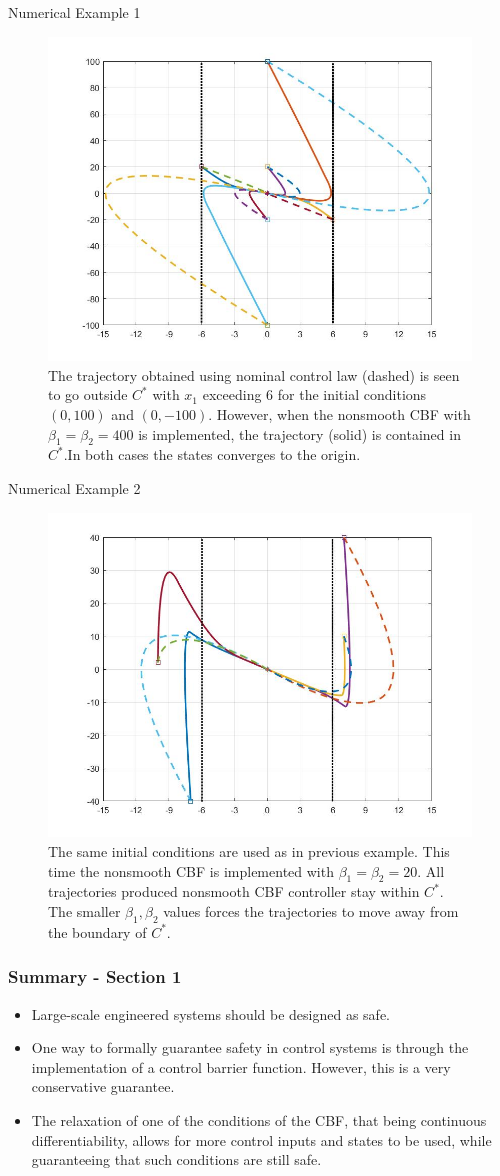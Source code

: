 \documentclass[aspectratio=169,xcolor=dvipsnames]{beamer}
\begin{document}
\begin{frame}{Numerical Example 1}
    \begin{figure}
    \includegraphics[width=0.4\linewidth]{OutputOfFig1CBFbeta20.jpg}
    \caption{The trajectory obtained using nominal control law (dashed) is seen to go outside $C^*$ with $x_1$ exceeding $6$ for the initial conditions $(0,100)$ and $(0,-100)$. However, when the nonsmooth CBF with $\beta_1=\beta_2=400$ is implemented, the trajectory (solid) is contained in $C^*$.In both cases the states converges to the origin.}
    \end{figure}
\end{frame}


\begin{frame}{Numerical Example 2}
    \begin{figure}
    \includegraphics[width=0.4\linewidth]{OutputOfFig2CBFbeta20.jpg}
    \caption{The same initial conditions are used as in previous example. This time the nonsmooth CBF is implemented with $\beta_1=\beta_2=20$. All trajectories produced nonsmooth CBF controller stay within $C^*$. The smaller $\beta_1,\beta_2$ values forces the trajectories to move away from the boundary of $C^*$.}
    \end{figure}
\end{frame}


\begin{frame}[fragile] %
    \frametitle{Summary - Section 1}
    \begin{itemize}
    \item Large-scale engineered systems should be designed as safe.
   \item One way to formally guarantee safety in control systems is through the implementation of a control barrier function. However, this is a very conservative guarantee.
    \item The relaxation of one of the conditions of the CBF, that being continuous differentiability, allows for more control inputs and states to be used, while guaranteeing that such conditions are still safe. 
    \end{itemize}
\end{frame}
\end{document}
